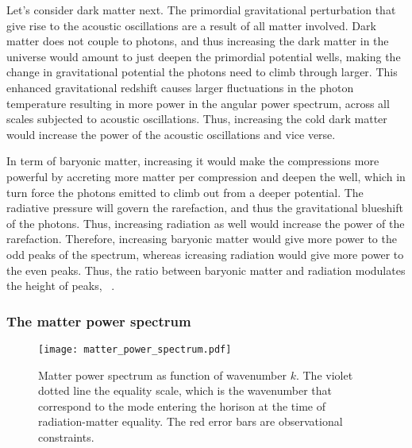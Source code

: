         Let's consider dark matter next. The primordial gravitational perturbation that give rise to the acoustic oscillations are a result of all matter involved. Dark matter does not couple to photons, and thus increasing the dark matter in the universe would amount to just deepen the primordial potential wells, making the change in gravitational potential the photons need to climb through larger. This enhanced gravitational redshift causes larger fluctuations in the photon temperature resulting in more power in the angular power spectrum, across all scales subjected to acoustic oscillations. Thus, increasing the cold dark matter would increase the power of the acoustic oscillations and vice verse. 

        In term of baryonic matter, increasing it would make the compressions more powerful by accreting more matter per compression and deepen the well, which in turn force the photons emitted to climb out from a deeper potential. The radiative pressure will govern the rarefaction, and thus the gravitational blueshift of the photons. Thus, increasing radiation as well would increase the power of the rarefaction. Therefore, increasing baryonic matter would give more power to the odd peaks of the spectrum, whereas icreasing radiation would give more power to the even peaks. Thus, the ratio between baryonic matter and radiation modulates the height of peaks, ~\cite{Hu_1996}.

    \subsubsection{The matter power spectrum}
    
    \begin{figure}
        \texttt{[image: matter\_power\_spectrum.pdf]}
        \caption{Matter power spectrum as function of wavenumber $k$. The violet dotted line the equality scale, which is the wavenumber that correspond to the mode entering the horison at the time of radiation-matter equality. The red error bars are observational constraints.}
        \label{fig:m4:matter_power_spectrum}
    \end{figure}